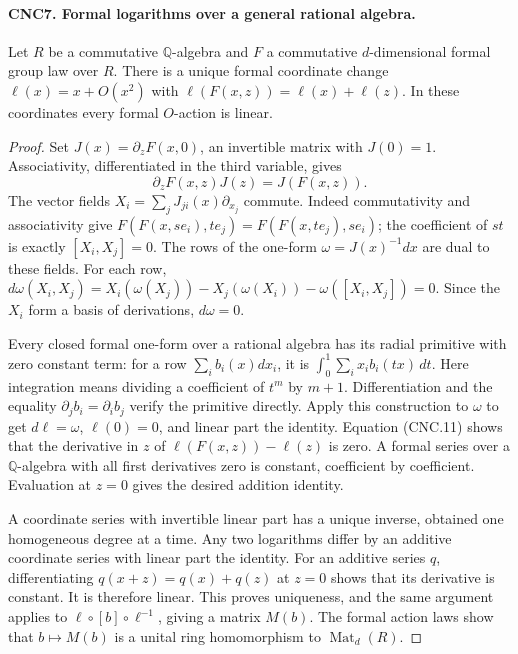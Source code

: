 \paragraph{CNC7. Formal logarithms over a general rational algebra.}
\label{claim:CNC7}
Let \(R\) be a commutative \(\mathbb Q\)-algebra and \(F\) a
commutative \(d\)-dimensional formal group law over \(R\).
There is a unique formal coordinate change \(\ell(x)=x+O(x^2)\)
with
\(\ell(F(x,z))=\ell(x)+\ell(z)\).  In these coordinates every
formal \(O\)-action is linear.
\begin{proof}
Set \(J(x)=\partial_zF(x,0)\), an invertible matrix with
\(J(0)=1\).  Associativity, differentiated in the third variable,
gives
\[
 \partial_zF(x,z)J(z)=J(F(x,z)).                              \tag{CNC.11}
\]
The vector fields
\(X_i=\sum_jJ_{ji}(x)\partial_{x_j}\) commute.  Indeed
commutativity and associativity give
\(F(F(x,se_i),te_j)=F(F(x,te_j),se_i)\); the coefficient of
\(st\) is exactly \([X_i,X_j]=0\).
The rows of the one-form \(\omega=J(x)^{-1}dx\) are dual to
these fields.  For each row,
\(d\omega(X_i,X_j)=X_i(\omega(X_j))-X_j(\omega(X_i))
-\omega([X_i,X_j])=0\).  Since the \(X_i\) form a basis of
derivations, \(d\omega=0\).

Every closed formal one-form over a rational algebra has its radial
primitive with zero constant term: for a row \(\sum_i b_i(x)dx_i\),
it is
\(\int_0^1\sum_i x_i b_i(tx)\,dt\).
Here integration means dividing a coefficient of \(t^m\) by
\(m+1\).  Differentiation and the equality
\(\partial_jb_i=\partial_ib_j\) verify the primitive directly.
Apply this construction to \(\omega\) to get \(d\ell=\omega\),
\(\ell(0)=0\), and linear part the identity.
Equation (CNC.11) shows that the derivative in \(z\) of
\(\ell(F(x,z))-\ell(z)\) is zero.  A formal series over a
\(\mathbb Q\)-algebra with all first derivatives zero is constant,
coefficient by coefficient.  Evaluation at \(z=0\) gives the desired
addition identity.

A coordinate series with invertible linear part has a unique inverse,
obtained one homogeneous degree at a time.  Any two logarithms differ
by an additive coordinate series with linear part the identity.
For an additive series \(q\), differentiating
\(q(x+z)=q(x)+q(z)\) at \(z=0\) shows that its derivative is
constant.  It is therefore linear.  This proves uniqueness, and the
same argument applies to
\(\ell\circ[b]\circ\ell^{-1}\), giving a matrix \(M(b)\).
The formal action laws show that \(b\mapsto M(b)\) is a unital
ring homomorphism to \(\operatorname{Mat}_d(R)\).
\end{proof}

